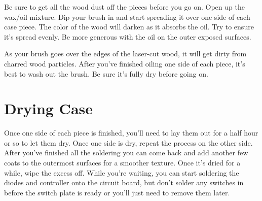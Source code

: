 \documentclass{article}
\begin{document}
Be sure to get all the wood dust off the pieces before you go on. Open
up the wax/oil mixture. Dip your brush in and start spreading it over
one side of each case piece. The color of the wood will darken as it
absorbs the oil. Try to ensure it's spread evenly. Be more generous
with the oil on the outer exposed surfaces.

\vspace{1em}
\noindent{}
\vspace{1em}

As your brush goes over the edges of the laser-cut wood, it will get
dirty from charred wood particles. After you've finished oiling one
side of each piece, it's best to wash out the brush. Be sure it's
fully dry before going on.

\section{Drying Case}

Once one side of each piece is finished, you'll need to lay them out
for a half hour or so to let them dry. Once one side is dry, repeat
the process on the other side. After you've finished all the soldering
you can come back and add another few coats to the outermost surfaces
for a smoother texture. Once it's dried for a while, wipe the excess
off. While you're waiting, you can start soldering the diodes and
controller onto the circuit board, but don't solder any switches in
before the switch plate is ready or you'll just need to remove them
later.
\end{document}
